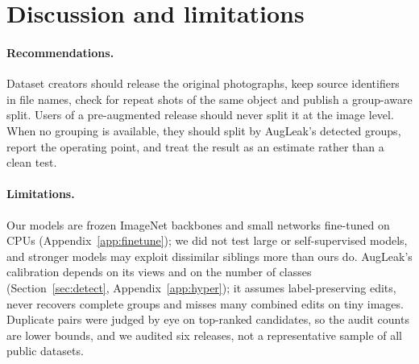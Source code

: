 \section{Discussion and limitations}
\label{sec:discussion}

\paragraph{Recommendations.}
Dataset creators should release the original photographs, keep source identifiers in file names, check for repeat shots of the same object and publish a group-aware split. Users of a pre-augmented release should never split it at the image level. When no grouping is available, they should split by AugLeak's detected groups, report the operating point, and treat the result as an estimate rather than a clean test.

\paragraph{Limitations.}
Our models are frozen ImageNet backbones and small networks fine-tuned on CPUs (Appendix~\ref{app:finetune}); we did not test large or self-supervised models, and stronger models may exploit dissimilar siblings more than ours do. AugLeak's calibration depends on its views and on the number of classes (Section~\ref{sec:detect}, Appendix~\ref{app:hyper}); it assumes label-preserving edits, never recovers complete groups and misses many combined edits on tiny images. Duplicate pairs were judged by eye on top-ranked candidates, so the audit counts are lower bounds, and we audited six releases, not a representative sample of all public datasets.
